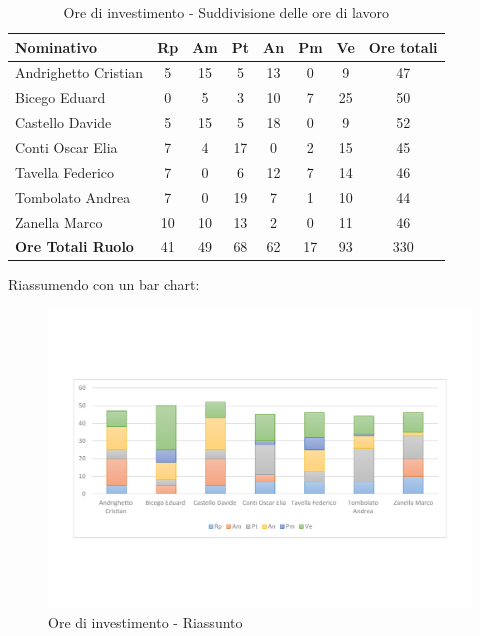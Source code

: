 \documentclass[../PianoProgetto.tex]{subfiles}
\begin{document}
	\begin{table}[h]
		\begin{tabularx}{\textwidth}{l  * {6}{C}  c}
			\toprule
			\textbf{Nominativo} & \textbf{Rp} & \textbf{Am} & \textbf{Pt} 
						& \textbf{An} & \textbf{Pm} & \textbf{Ve} & \textbf{Ore totali} \\
			\midrule
			Andrighetto Cristian & 5 & 15 & 5 & 13 &	0 &	9 &	47 \\
			Bicego Eduard & 0 & 5 & 3 & 10 & 7 & 25 & 50 \\
			Castello Davide & 5 & 15 & 5 & 18 & 0 & 9 & 52 \\
			Conti Oscar Elia & 7 & 4 & 17 & 0 & 2 & 15 & 45 \\
			Tavella Federico &	7 & 0 & 6 & 12 & 7 & 14 & 46 \\
			Tombolato Andrea & 7 & 0 & 19 & 7 & 1 & 10 & 44 \\
			Zanella Marco & 10 & 10 & 13 & 2 & 0 & 11 & 46 \\
			\midrule			
			\textbf{Ore Totali Ruolo} & 41 & 49 & 68 & 62 & 17 & 93 & 330 \\
			\bottomrule
		\end{tabularx}
		\caption{Ore di investimento - Suddivisione delle ore di lavoro}
		\label{tab:investimento_ore}
	\end{table}
\vfill	
	Riassumendo con un bar chart:
	
	\begin{figure}[!h]
		\centering
		\includegraphics[width=\textwidth , trim=2cm 5cm 2cm 5cm]{grafici/Riepilogo/Investimento/ore-persona}
			\caption{Ore di investimento - Riassunto}
		\label{fig:BarChart-investimento_ore}
	\end{figure}
\vfill
\newpage
\vfill	
\end{document}
